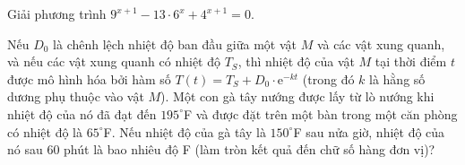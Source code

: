 \begin{bt}%
		Giải phương trình $9^{x+1}-13\cdot 6^x+4^{x+1}=0$.
\end{bt}

\begin{bt}%
	Nếu $D_0$ là chênh lệch nhiệt độ ban đầu giữa một vật $M$ và các vật xung quanh, và nếu các vật xung quanh có nhiệt độ $T_S$, thì nhiệt độ của vật $M$ tại thời điểm $t$ được mô hình hóa bởi hàm số $T(t)=T_S+D_0 \cdot \mathrm{e}^{-kt}$ (trong đó $k$ là hằng số dương phụ thuộc vào vật $M$). Một con gà tây nướng được lấy từ lò nướng khi nhiệt độ của nó đã đạt đến $195^\circ$F và được đặt trên một bàn trong một căn phòng có nhiệt độ là $65^\circ$F. Nếu nhiệt độ của gà tây là $150^\circ$F sau nửa giờ, nhiệt độ của nó sau $60$ phút là bao nhiêu độ F (làm tròn kết quả đến chữ số hàng đơn vị)? 
\end{bt}

